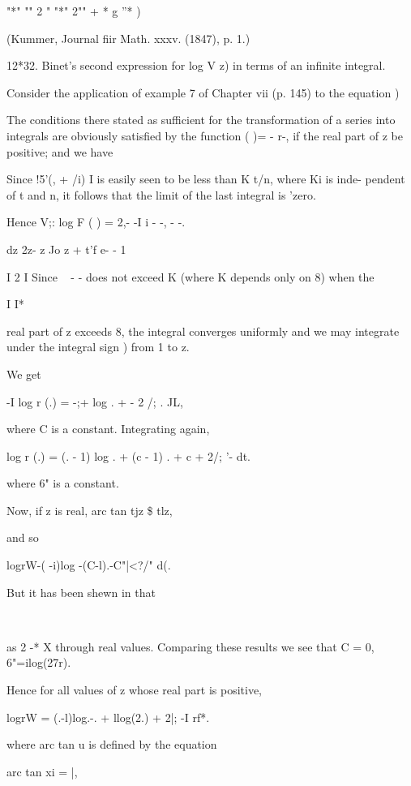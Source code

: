 "*" "" 2 " "*" 2"" + * g ''* )

(Kummer, Journal fiir Math. xxxv. (1847), p. 1.)

12*32. Binet's second expression for log V z) in terms of an infinite
integral.

Consider the application of example 7 of Chapter vii (p. 145) to the
equation )

The conditions there stated as sufficient for the transformation of a
series into integrals are obviously satisfied by the function ( )= -
r-, if the real part of z be positive; and we have

Since !5'(, + /i) I is easily seen to be less than K t/n, where Ki is
inde- pendent of t and n, it follows that the limit of the last
integral is 'zero.

Hence V;: log F ( ) = 2,- -I i - -, - -.

dz 2z- z Jo z + t'f e- - 1

I 2 I Since ~ - - does not exceed K (where K depends only on 8) when
the

I I*

real part of z exceeds 8, the integral converges uniformly and we may
integrate under the integral sign ) from 1 to z.

We get

-I log r (.) = -;+ log . + - 2 /; . JL,

where C is a constant. Integrating again,

log r (.) = (. - 1) log . + (c - 1) . + c + 2/; '- dt.

where 6" is a constant.

%
%

Now, if z is real, arc tan tjz \$ tlz,

and so

logrW-( -i)log -(C-l).-C"|<?/" d(.

But it has been shewn in that

\ \ %

as 2 -* X through real values. Comparing these results we see that C =
0, 6"=ilog(27r).

Hence for all values of z whose real part is positive,

logrW = (.-l)log.-. + llog(2.) + 2|; -I rf*.

where arc tan u is defined by the equation

arc tan xi = |,

